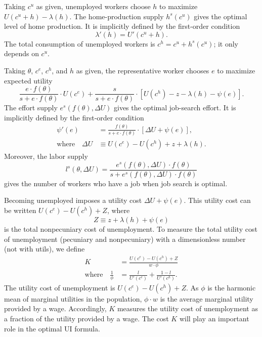 \documentclass[letterpaper,12pt,leqno]{article}
\newcommand{\pre}[1]{\left( #1 \right)}
\newcommand{\brk}[1]{\left[ #1 \right]}
\def \D{{\Delta}}
\def \t{{\theta}}
\def \l{{\lambda}}
\def \p{{\psi}}
\def \f{{\phi}}
\begin{document}
Taking $c^{u}$ as given, unemployed workers choose $h$ to maximize $U(c^{u}+h)-\l(h)$. The home-production supply $h^{s}(c^u)$ gives the optimal level of home production. It is implicitly defined by the first-order condition
\begin{equation}
\l'(h)=U'\pre{c^{u}+h}.
\label{eq:hs}\end{equation}
The total consumption of unemployed workers is $c^{h}=c^{u}+h^{s}(c^{u})$; it only depends on $c^u$.

Taking $\t$, $c^{e}$, $c^{h}$, and $h$ as given, the representative worker chooses $e$ to maximize expected utility
\begin{equation}
\frac{e\cdot f(\t)}{s+e\cdot f(\t)}\cdot U(c^{e})+\frac{s}{s+e\cdot f(\t)}\cdot \brk{U(c^{h})-z-\l(h)-\p(e)}.
\label{eq:sw}\end{equation}
The effort supply $e^{s}(f(\t),\D U)$ gives the optimal job-search effort. It is implicitly defined by the first-order condition
\begin{align}
\p'(e)& =\frac{f(\t)}{s+e\cdot f(\t)}\cdot \brk{\D U + \p(e)},\label{eq:es}\\
\text{where}\quad \D U &\equiv U(c^{e})-U(c^{h})+z+\l(h).\label{eq:DU}
\end{align}
Moreover, the labor supply
\begin{equation*}
l^{s}(\t,\D U)=\frac{e^{s}(f(\t),\D U)\cdot f(\t)}{s+e^{s}(f(\t),\D U)\cdot f(\t)}
\end{equation*}
gives the number of workers who have a job when job search is optimal.

Becoming unemployed imposes a utility cost $\D U+\p(e)$. This utility cost can be written $U(c^{e})-U(c^{h})+Z$, where 
\begin{equation}
Z \equiv z +\l(h)+\p(e)
\label{eq:Z}\end{equation} 
is the total nonpecuniary cost of unemployment. To measure the total utility cost of unemployment (pecuniary and nonpecuniary) with a dimensionless number (not with utils), we define
\begin{align}
K & = \frac{U(c^e)-U(c^h)+Z}{w  \cdot  \f}\label{eq:ru}\\
\text{where}\quad \frac{1}{\f} & = \frac{l}{U'(c^{e})}+\frac{1-l}{U'(c^{h})}.\label{eq:phi}
\end{align}
The utility cost of unemployment is $U(c^e)-U(c^h)+Z$. As $\f$ is the harmonic mean of marginal utilities in the population, $\f\cdot w$ is the average marginal utility provided by a wage. Accordingly, $K$ measures the utility cost of unemployment as a fraction of the utility provided by a wage. The cost $K$ will play an important role in the optimal UI formula.
\end{document}
